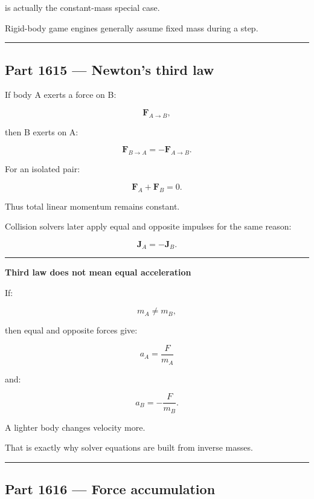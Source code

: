 is actually the constant-mass special case.

Rigid-body game engines generally assume fixed mass during a step.

\begin{center}\rule{0.5\linewidth}{0.5pt}\end{center}

\subsection{Part 1615 --- Newton's third law}\label{06-engine-ii-ch034-part-1615-newtons-third-law}

If body A exerts a force on B:

\[
\mathbf{F}_{A\rightarrow B},
\]

then B exerts on A:

\[
\boxed{
\mathbf{F}_{B\rightarrow A}
=
-\mathbf{F}_{A\rightarrow B}.
}
\]

For an isolated pair:

\[
\mathbf{F}_A+
\mathbf{F}_B=0.
\]

Thus total linear momentum remains constant.

Collision solvers later apply equal and opposite impulses for the same reason:

\[
\mathbf{J}_A=-\mathbf{J}_B.
\]

\begin{center}\rule{0.5\linewidth}{0.5pt}\end{center}

\textbf{Third law does not mean equal acceleration}

If:

\[
m_A\neq m_B,
\]

then equal and opposite forces give:

\[
a_A=\frac{F}{m_A}
\]

and:

\[
a_B=-\frac{F}{m_B}.
\]

A lighter body changes velocity more.

That is exactly why solver equations are built from inverse masses.

\begin{center}\rule{0.5\linewidth}{0.5pt}\end{center}

\subsection{Part 1616 --- Force accumulation}\label{06-engine-ii-ch034-part-1616-force-accumulation}

